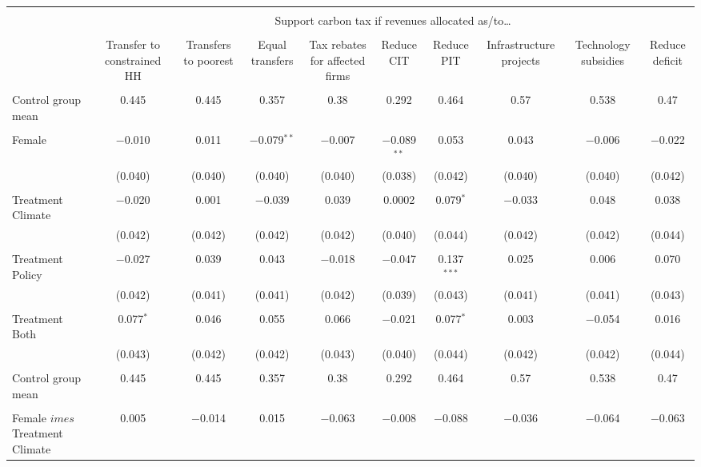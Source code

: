 
\begin{tabular}{@{\extracolsep{5pt}}lccccccccc} 
\\[-1.8ex]\hline 
\hline \\[-1.8ex] 
 & \multicolumn{9}{c}{Support carbon tax if revenues allocated as/to…} \\ 
\cline{2-10} 
\\[-1.8ex] & Transfer to constrained HH & Transfers to poorest & Equal transfers & Tax rebates for affected firms & Reduce CIT & Reduce PIT & Infrastructure projects & Technology subsidies & Reduce deficit \\ 
\hline \\[-1.8ex] 
 Control group mean & 0.445 & 0.445 & 0.357 & 0.38 & 0.292 & 0.464 & 0.57 & 0.538 & 0.47  \\ \hline \\[-1.8ex] Female & $-$0.010 & 0.011 & $-$0.079$^{**}$ & $-$0.007 & $-$0.089$^{**}$ & 0.053 & 0.043 & $-$0.006 & $-$0.022 \\ 
  & (0.040) & (0.040) & (0.040) & (0.040) & (0.038) & (0.042) & (0.040) & (0.040) & (0.042) \\ 
  & & & & & & & & & \\ 
 Treatment Climate & $-$0.020 & 0.001 & $-$0.039 & 0.039 & 0.0002 & 0.079$^{*}$ & $-$0.033 & 0.048 & 0.038 \\ 
  & (0.042) & (0.042) & (0.042) & (0.042) & (0.040) & (0.044) & (0.042) & (0.042) & (0.044) \\ 
  & & & & & & & & & \\ 
 Treatment Policy & $-$0.027 & 0.039 & 0.043 & $-$0.018 & $-$0.047 & 0.137$^{***}$ & 0.025 & 0.006 & 0.070 \\ 
  & (0.042) & (0.041) & (0.041) & (0.042) & (0.039) & (0.043) & (0.041) & (0.041) & (0.043) \\ 
  & & & & & & & & & \\ 
 Treatment Both & 0.077$^{*}$ & 0.046 & 0.055 & 0.066 & $-$0.021 & 0.077$^{*}$ & 0.003 & $-$0.054 & 0.016 \\ 
  & (0.043) & (0.042) & (0.042) & (0.043) & (0.040) & (0.044) & (0.042) & (0.042) & (0.044) \\ 
  & & & & & & & & & \\ 
 Control group mean & 0.445 & 0.445 & 0.357 & 0.38 & 0.292 & 0.464 & 0.57 & 0.538 & 0.47  \\ \hline \\[-1.8ex] Female $	imes$ Treatment Climate & 0.005 & $-$0.014 & 0.015 & $-$0.063 & $-$0.008 & $-$0.088 & $-$0.036 & $-$0.064 & $-$0.063 \\ 

\end{tabular}
